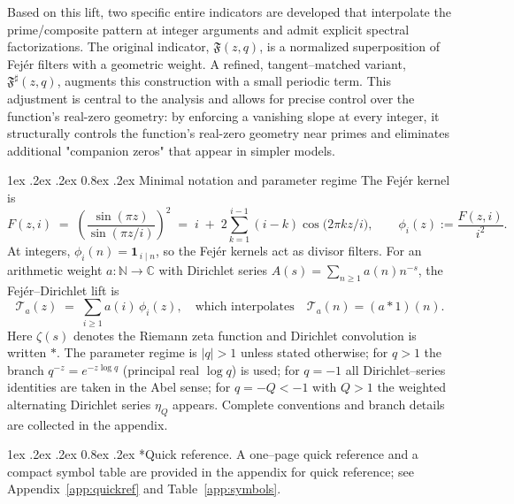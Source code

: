 \documentclass[11pt,a4paper]{amsart}
\makeatletter
\newcommand{\Fbase}{\mathfrak F}
\newcommand{\Fsharp}{\Fbase^{\sharp}}
\renewcommand\paragraph{\@startsection{paragraph}{4}{\z@}%
  {1ex \@plus .2ex \@minus .2ex}%
  {0.8ex \@plus .2ex}%
  {\normalfont\bfseries}}
\theoremstyle{plain}
\theoremstyle{definition}
\theoremstyle{remark}
\makeatother
\begin{document}
Based on this lift, two specific entire indicators are developed that interpolate the prime/composite pattern at integer arguments and admit explicit spectral factorizations. The original indicator, $\mathfrak F(z,q)$, is a normalized superposition of Fej\'er filters with a geometric weight. A refined, tangent–matched variant, $\Fsharp(z,q)$, augments this construction with a small periodic term. This adjustment is central to the analysis and allows for precise control over the function's real-zero geometry: by enforcing a vanishing slope at every integer, it structurally controls the function's real-zero geometry near primes and eliminates additional "companion zeros" that appear in simpler models.

\paragraph{Minimal notation and parameter regime}
The Fej\'er kernel is
\[
F(z,i)\;=\;\left(\frac{\sin(\pi z)}{\sin(\pi z/i)}\right)^{\!2}
\;=\;i\;+\;2\sum_{k=1}^{i-1}(i-k)\cos\!\bigl(2\pi k z/i\bigr),
\qquad
\phi_i(z):=\frac{F(z,i)}{i^{2}}.
\]
At integers, $\phi_i(n)=\mathbf 1_{\,i\mid n}$, so the Fej\'er kernels act as divisor filters.
For an arithmetic weight $a:\mathbb N\to\mathbb C$ with Dirichlet series $A(s)=\sum_{n\ge1} a(n)n^{-s}$, the Fej\'er–Dirichlet lift is
\[
\mathcal T_a(z)\;=\;\sum_{i\ge1} a(i)\,\phi_i(z),
\quad\text{which interpolates}\quad
\mathcal T_a(n)=(a*1)(n).
\]
Here $\zeta(s)$ denotes the Riemann zeta function and Dirichlet convolution is written $*$.
The parameter regime is $|q|>1$ unless stated otherwise; for $q>1$ the branch $q^{-z}=e^{-z\log q}$ (principal real $\log q$) is used; for $q=-1$ all Dirichlet–series identities are taken in the Abel sense; for $q=-Q<-1$ with $Q>1$ the weighted alternating Dirichlet series $\eta_Q$ appears.
Complete conventions and branch details are collected in the appendix.

\paragraph*{Quick reference.}
A one–page quick reference and a compact symbol table are provided in the appendix for quick reference; see Appendix~\ref{app:quickref} and Table~\ref{app:symbols}.
\end{document}
